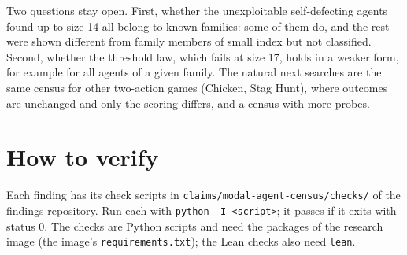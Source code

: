 \documentclass{article}
\begin{document}
Two questions stay open. First, whether the unexploitable self-defecting agents found up to size
14 all belong to known families: some of them do, and the rest were shown different from family
members of small index but not classified. Second, whether the threshold law, which fails at
size 17, holds in a weaker form, for example for all agents of a given family. The natural next
searches are the same census for other two-action games (Chicken, Stag Hunt), where outcomes are
unchanged and only the scoring differs, and a census with more probes.

\section{How to verify}

Each finding has its check scripts in \texttt{claims/modal-agent-census/checks/} of the findings repository. Run each with \texttt{python -I <script>}; it passes if it exits with status 0. The checks are Python scripts and need the packages of the research image (the image's \texttt{requirements.txt}); the Lean checks also need \texttt{lean}.



\end{document}
